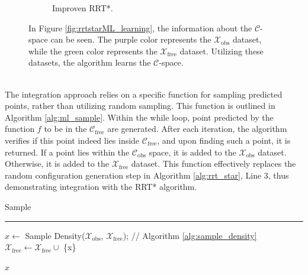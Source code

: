 \documentclass{ctuthesis}
\begin{document}
\begin{figure}[!ht]
\begin{subfigure}[b]{0.45\textwidth}
      \caption{Improven RRT*.}
  \end{subfigure}
  \caption{In Figure \ref{fig:rrtstarML_learning}, 
  the information about the $\mathcal{C}$-space can be seen. 
  The purple color represents the \( \mathcal{X}_{\text{obs}} \) dataset, 
  while the green color represents the \( \mathcal{X}_{\text{free}} \) dataset. 
  Utilizing these datasets, the algorithm learns the $\mathcal{C}$-space.}
  \label{fig:LearningConfigSpace}
\end{figure}
\\[12pt]
The integration approach relies on a specific function for sampling predicted points,
rather than utilizing random sampling. 
This function is outlined in Algorithm \ref{alg:ml_sample}. 
Within the while loop, 
point predicted by the function $f$ to be in the $\mathcal{C}_{\text{free}}$ are generated. 
After each iteration, 
the algorithm verifies if this point indeed lies inside $\mathcal{C}_{\text{free}}$, 
and upon finding such a point, it is returned. 
If a point lies within the $\mathcal{C}_{\text{obs}}$ space, 
it is added to the $\mathcal{X}_{\text{obs}}$ dataset.
Otherwise, it is added to the $\mathcal{X}_{\text{free}}$ dataset.
This function effectively replaces the random configuration generation step 
in Algorithm \ref{alg:rrt_star}, Line 3, thus demonstrating integration with the RRT* algorithm.
\\[12pt] 
\begin{algorithm}[H]
  \caption{Sample}
  \label{alg:ml_sample}
  \vspace{0.1cm}
  \hrule
  \vspace{0.2cm}
  $x \gets$ Sample Density($\mathcal{X}_{\text{obs}}$, $\mathcal{X}_{\text{free}}$); \hfill // Algorithm \ref{alg:sample_density}\; 
  $\mathcal{X}_{\text{free}} \gets \mathcal{X}_{\text{free}} \cup$ \{x\}\;
  
  \Return $x$\;
\end{algorithm}
\end{document}
